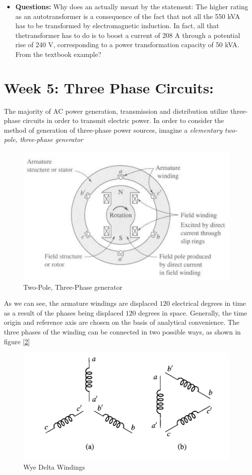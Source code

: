 \documentclass{book}
\begin{document}
\begin{itemize}
	\item \textbf{Questions:} Why does an actually meant by the statement: The higher rating as an autotransformer is a consequence of the fact that not all the 550 kVA has to be transformed by electromagnetic induction. In fact, all that thetransformer has to do is to boost a current of 208 A through a potential rise of 240 V,	corresponding to a power transformation capacity of 50 kVA. From the textbook example?
\end{itemize}


\section{Week 5: Three Phase Circuits:}

The majority of AC power generation, transmission and distribution utilize three-phase circuits in order to transmit electric power. In order to consider the method of generation of three-phase power sources, imagine a \textit{elementary two-pole, three-phase generator}
\begin{figure}[h]
	\centering
	\includegraphics[width=0.4\linewidth]{Screenshots/screenshot001}
	\caption{Two-Pole, Three-Phase generator}
	\label{fig:screenshot001}
\end{figure}

As we can see, the armature windings are displaced $120$ electrical degrees in time as a result of the phases being displaced $120$ degrees in space. Generally, the time origin and reference axis are chosen on the basis of analytical convenience. The three phases of the winding can be connected in two possible ways, as shown in figure [\ref{fig:wyedelta2}]
\begin{figure}[h]
	\centering
	\includegraphics[width=0.4\linewidth]{Screenshots/wye_delta_2}
	\caption{Wye Delta Windings}
	\label{fig:wyedelta2}
\end{figure}
\end{document}
